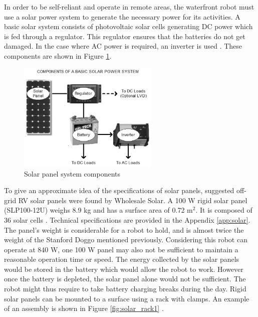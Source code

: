 In order to be self-reliant and operate in remote areas, the waterfront robot must use a solar power system to generate the necessary power for its activities. A basic solar system consists of photovoltaic solar cells generating DC power which is fed through a regulator. This regulator ensures that the batteries do not get damaged. In the case where AC power is required, an inverter is used \cite{solar_power_australia_solar_nodate}. These components are shown in Figure \ref{fig:power_system}.

\begin{figure}[H]
    \centering
    \includegraphics[width=0.6\textwidth]{Sections/LiteratureReview/img/solar/power_system.JPG}
    \caption{Solar panel system components \cite{solar_power_australia_solar_nodate}}
    \label{fig:power_system}
\end{figure}

To give an approximate idea of the specifications of solar panels, suggested off-grid RV solar panels were found by Wholesale Solar. A 100 W rigid solar panel (SLP100-12U) weighs 8.9 kg and has a surface area of 0.72 m$^{2}$. It is composed of 36 solar cells \cite{wholesale_solar_solarland_nodate}. Technical specifications are provided in the Appendix \ref{app:solar}. The panel's weight is considerable for a robot to hold, and is almost twice the weight of the Stanford Doggo \cite{kau_stanford_2019} mentioned previously. Considering this robot can operate at 840 W, one 100 W panel may also not be sufficient to maintain a reasonable operation time or speed. The energy collected by the solar panels would be stored in the battery which would allow the robot to work. However once the battery is depleted, the solar panel alone would not be sufficient. The robot might thus require to take battery charging breaks during the day. Rigid solar panels can be mounted to a surface using a rack with clamps. An example of an assembly is shown in Figure \ref{fig:solar_rack1} \cite{gogreensolar_ironridge_2015}.

